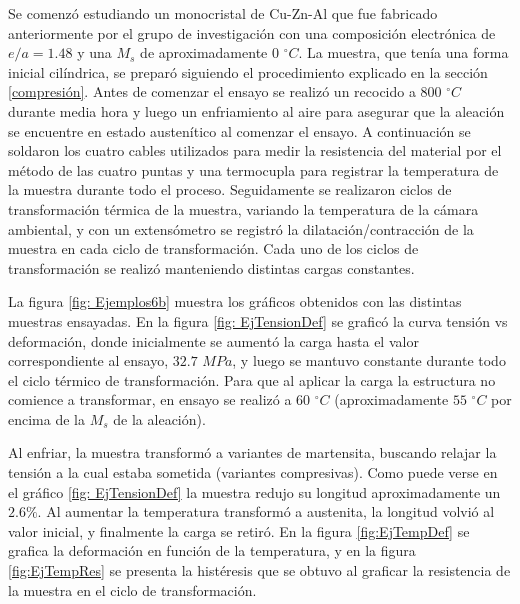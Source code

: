 \documentclass[a4paper,12pt,fleqn,twoside,openany]{book}
\begin{document}
Se comenzó estudiando un monocristal de Cu-Zn-Al que fue fabricado anteriormente por el grupo de investigación con una composición electrónica de $e/a=1.48$ y una $M_s$ de aproximadamente $0$ $^\circ C$. La muestra, que tenía una forma inicial cilíndrica, se preparó siguiendo el procedimiento explicado en la sección \ref{compresión}. Antes de comenzar el ensayo se realizó un recocido a $800$ $ ^\circ C$ durante media hora y luego un enfriamiento al aire para asegurar que la aleación se encuentre en estado austenítico al comenzar el ensayo. A continuación se soldaron los cuatro cables utilizados para medir la resistencia del material por el método de las cuatro puntas y una termocupla para registrar la temperatura de la muestra durante todo el proceso. Seguidamente se realizaron ciclos de transformación térmica de la muestra, variando la temperatura de la cámara ambiental, y con un extensómetro se registró la dilatación/contracción de la muestra en cada ciclo de transformación. Cada uno de los ciclos de transformación se realizó manteniendo distintas cargas constantes. 

La figura \ref{fig: Ejemplos6b} muestra los gráficos obtenidos con las distintas muestras ensayadas. En la figura \ref{fig: EjTensionDef} se graficó la curva tensión vs deformación, donde inicialmente se aumentó la carga hasta el valor correspondiente al ensayo, $32.7$ $MPa$, y luego se mantuvo constante durante todo el ciclo térmico de transformación. Para que al aplicar la carga la estructura no comience a transformar, en ensayo se realizó a $60$ $^\circ C$ (aproximadamente $55$ $^\circ C$ por encima de la $M_s$ de la aleación).  


Al enfriar, la muestra transformó a variantes de martensita, buscando relajar la tensión a la cual estaba sometida (variantes compresivas). Como puede verse en el gráfico \ref{fig: EjTensionDef} la muestra redujo su longitud aproximadamente un $2.6\%$. Al aumentar la temperatura transformó a austenita, la longitud volvió al valor inicial, y finalmente la carga se retiró. En la figura \ref{fig:EjTempDef} se grafica la deformación en función de la temperatura, y en la figura \ref{fig:EjTempRes} se presenta la histéresis que se obtuvo al graficar la resistencia de la muestra en el ciclo de transformación. 

\end{document}
